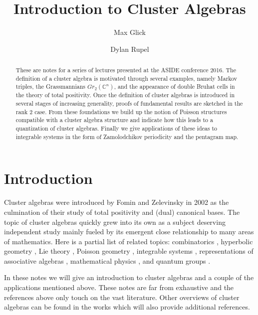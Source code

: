 \documentclass{amsart}
\title{Introduction to Cluster Algebras}
\author{Max Glick}
\author{Dylan Rupel}
\theoremstyle{definition}
\theoremstyle{remark}
\numberwithin{equation}{section}
\newcommand{\CC}{{\mathbb{C}}}
\begin{document}
\begin{abstract}
  These are notes for a series of lectures presented at the ASIDE conference 2016.  The definition of a cluster algebra is motivated through several examples, namely Markov triples, the Grassmannians $Gr_2(\CC^n)$, and the appearance of double Bruhat cells in the theory of total positivity.  Once the definition of cluster algebras is introduced in several stages of increasing generality, proofs of fundamental results are sketched in the rank 2 case.  From these foundations we build up the notion of Poisson structures compatible with a cluster algebra structure and indicate how this leads to a quantization of cluster algebras.  Finally we give applications of these ideas to integrable systems in the form of Zamolodchikov periodicity and the pentagram map.
\end{abstract}
\maketitle

\section{Introduction}
  Cluster algebras were introduced by Fomin and Zelevinsky \cite{FZ02} in 2002 as the culmination of their study of total positivity \cite{FZ99} and (dual) canonical bases.  The topic of cluster algebras quickly grew into its own as a subject deserving independent study mainly fueled by its emergent close relationship to many areas of mathematics.  Here is a partial list of related topics: combinatorics \cite{MP07}, hyperbolic geometry \cite{FG06,FST08,MSW13}, Lie theory \cite{GLS06}, Poisson geometry \cite{GSV03}, integrable systems \cite{dFK10,G11}, representations of associative algebras \cite{CC06,CK06,BMRRT06,R11,Q12,R15}, mathematical physics \cite{EF12,ABCGPT14}, and quantum groups \cite{K12,GLS13,KQ14,BR15}.

  In these notes we will give an introduction to cluster algebras and a couple of the applications mentioned above.  These notes are far from exhaustive and the references above only touch on the vast literature.  Other overviews of cluster algebras can be found in the works \cite{K10,W13,GLS} which will also provide additional references.
\end{document}
